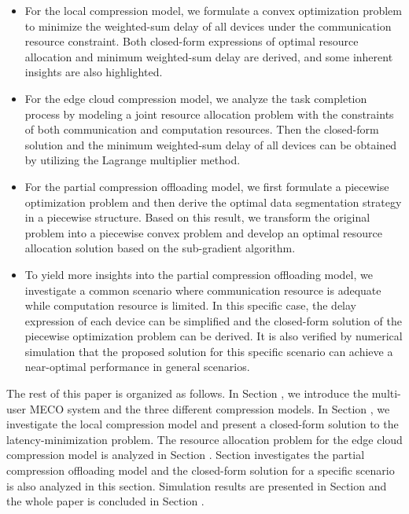 \documentclass[journal,draftcls,onecolumn,12pt,twoside]{IEEEtran}
\begin{document}
\begin{itemize}
	\item For the local compression model, we formulate a convex optimization problem to minimize the weighted-sum delay of all devices under the communication resource constraint. Both closed-form
          expressions of optimal resource allocation and minimum weighted-sum delay are derived, and some inherent insights are also highlighted.
    \item For the edge cloud compression model, we analyze the task completion process by modeling a joint resource allocation problem with the constraints of both communication and computation resources.
          Then the closed-form solution and the minimum weighted-sum delay of all devices can be obtained by utilizing the Lagrange multiplier method.
    \item For the partial compression offloading model, we first formulate a piecewise optimization problem and then derive the optimal data segmentation strategy in a piecewise structure. Based on this
          result, we transform the original problem into a piecewise convex problem and develop an optimal resource allocation solution based on the sub-gradient algorithm.
    \item To yield more insights into the partial compression offloading model, we investigate a common scenario where
          communication resource is adequate while computation resource is limited. In this specific case, the delay expression of each device can be simplified and the closed-form solution of the piecewise optimization problem can be derived. It is also verified by numerical simulation that the proposed solution for this specific scenario can achieve a near-optimal performance in general scenarios.
\end{itemize}

The rest of this paper is organized as follows. In Section \uppercase\expandafter{}, we introduce the multi-user MECO system and the three different compression models. In Section \uppercase\expandafter{}, we investigate the local compression model and present a closed-form solution to the latency-minimization problem. The resource allocation problem for the edge cloud compression model is analyzed in Section \uppercase\expandafter{}. Section \uppercase\expandafter{} investigates the partial compression offloading model and the closed-form solution for a specific scenario is also analyzed in this section. Simulation results are presented in Section \uppercase\expandafter{} and the whole paper is concluded in Section \uppercase\expandafter{}.
\end{document}
